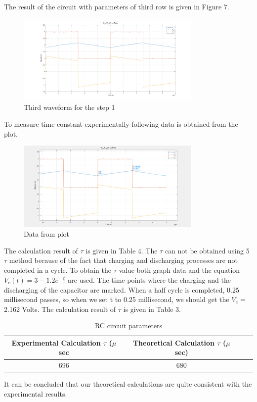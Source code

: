 \documentclass[letterpaper,12pt]{article}
\begin{document}
The result of the circuit with parameters of third row is given in Figure 7.

\begin{figure}[H]
	\centering
   \includegraphics[width=0.8\textwidth]{1a_3.png}
   \caption{Third waveform for the step 1}
\end{figure} 
To measure time constant experimentally following data is obtained from the plot.
\begin{figure}[H]
	\centering
   \includegraphics[width=0.8\textwidth]{1_3_plot_data.png}
   \caption{Data from plot}
\end{figure} 
The calculation result of \(\tau\) is given in Table 4. The \(\tau\) can not be obtained using 5 \(\tau\) method because of the fact that charging and discharging processes are not completed in a cycle. To obtain the \(\tau\) value both graph data and the equation \(V_c(t)= 3- 1.2 e^-\frac{t}{\tau}\) are used. The time points where the charging and the discharging of the capacitor are marked. When a half cycle is completed, 0.25 millisecond passes, so when we set t to 0.25 millisecond, we should get the \(V_c\) = 2.162 Volts. The calculation result of \(\tau\) is given in Table 3.
\begin{table}[H]
	\begin{center}
	\caption{RC circuit parameters}
	\vspace{2mm}
		\begin{tabular}{||c | c | c | c||} 
		 \hline
		 Experimental Calculation \(\tau\) (\(\mu\) sec & Theoretical Calculation \(\tau\) (\(\mu\) sec) \\ [0.5ex] 
		 \hline\hline
		 696 & 680 \\ 
		 \hline
	\end{tabular}
	\end{center}
	\end{table}
It can be concluded that our theoretical calculations are quite consistent with the experimental results.
\end{document}
